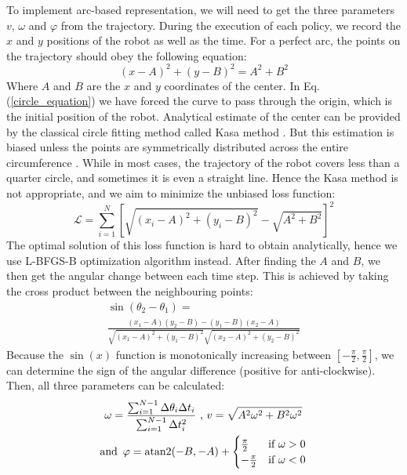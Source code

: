 To implement arc-based representation, we will need to get the three parameters $v$, $\omega$ and $\varphi$ from the trajectory. 
During the execution of each policy, we record the $x$ and $y$ positions of the robot as well as the time.
For a perfect arc, the points on the trajectory should obey the following equation:
\begin{equation}
(x - A)^2 + (y - B)^2 = A^2 + B^2
\label{circle_equation}
\end{equation}
Where $A$ and $B$ are the $x$ and $y$ coordinates of the center. In Eq. (\ref{circle_equation}) we have forced the curve to pass through the origin, which is the initial position of the robot.
Analytical estimate of the center can be provided by the classical circle fitting method called Kasa method \cite{Kasa_method}.
But this estimation is biased unless the points are symmetrically distributed across the entire circumference \cite{circle_fitting}.
While in most cases, the trajectory of the robot covers less than a quarter circle, and sometimes it is even a straight line.
Hence the Kasa method is not appropriate, and we aim to minimize the unbiased loss function: 
\begin{equation}
\mathcal{L} = 
\sum_{i=1}^N \left[
\sqrt{(x_i - A)^2 + (y_i - B)^2} - \sqrt{A^2 + B^2}
\right]^2
\label{circle_error}
\end{equation}
The optimal solution of this loss function is hard to obtain analytically, hence we use L-BFGS-B \cite{L-BFGS-B} optimization algorithm instead.
After finding the $A$ and $B$, we then get the angular change between each time step.
This is achieved by taking the cross product between the neighbouring points:
\begin{equation}
\begin{gathered}
\sin(\theta_2 - \theta_1) = \\
\frac{(x_1 - A)(y_2 - B)-(y_1 - B)(x_2 - A)}{
\sqrt{(x_1 - A)^2 + (y_1 - B)^2} \sqrt{(x_2 - A)^2 + (y_2 - B)^2}
}
\end{gathered}
\label{delta_theta}
\end{equation}
Because the $\sin (x)$ function is monotonically increasing between $[-\frac{\pi}{2}, \frac{\pi}{2}]$, we can determine the sign of the angular difference (positive for anti-clockwise).
Then, all three parameters can be calculated:
\begin{equation}
\begin{gathered}
\omega = \frac{
\sum_{i=1}^{N-1} \Delta \theta_i \Delta t_i}{
\sum_{i=1}^{N-1} \Delta t_i^2}
\text{ , }
v = \sqrt{A^2 \omega^2 + B^2 \omega^2}
\\
\text{and \,}
\varphi = \operatorname{atan2}(-B, -A) + 
\begin{cases} 
\frac{\pi}{2} & \text{if } \omega > 0 \\
-\frac{\pi}{2} & \text{if } \omega < 0 
\end{cases}
\end{gathered}
\label{all_three_parameters}
\end{equation}

